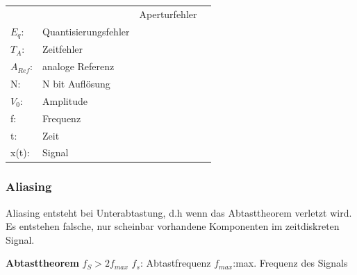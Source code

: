 \begin{longtable}[c]{ l  l l l }
&
\begin{minipage}{5cm}
\begin{tabular}{ll}
$E_{A}$: &Aperturfehler\\
$E_{q}$:&Quantisierungsfehler\\
$T_{A}$:&Zeitfehler\\
$A_{Ref}$:&analoge Referenz\\
N:& N bit Auflösung\\
$V_0$: &Amplitude\\
f: &Frequenz\\
t: &Zeit\\
x(t):&Signal
\end{tabular}


\end{minipage}
\\
\end{longtable}


\subsubsection{Aliasing}
Aliasing entsteht bei Unterabtastung, d.h wenn das Abtasttheorem verletzt wird.
Es entstehen falsche, nur scheinbar vorhandene Komponenten im zeitdiskreten
Signal.

	\textbf{Abtasttheorem}  $f_{S}>2f_{max}$ $f_{s}$: Abtastfrequenz $f_{max}$:max. Frequenz des Signals


%
